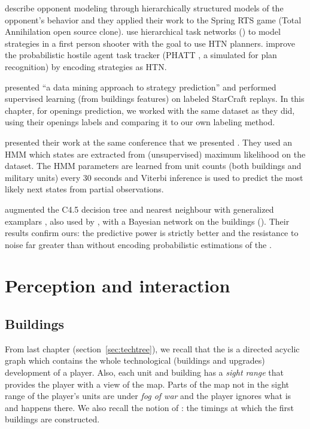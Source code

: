 \cite{schadd2007opponent} describe opponent modeling through hierarchically structured models of the opponent's behavior and they applied their work to the Spring RTS game (Total Annihilation open source clone). \cite{HTNPlanning} use hierarchical task networks () to model strategies in a first person shooter with the goal to use HTN planners. \cite{Kabanza2010} improve the probabilistic hostile agent task tracker (PHATT \citep{PHATT}, a simulated  for plan recognition) by encoding strategies as HTN. 

\cite{weberStrat} presented ``a data mining approach to strategy prediction'' and performed supervised learning (from buildings features) on labeled StarCraft replays. In this chapter, for openings prediction, we worked with the same dataset as they did, using their openings labels and comparing it to our own labeling method. %

\cite{HMMstrat_RTS_AIIDE11} presented their work at the same conference that we presented \citep{SYNNAEVE:StratPred}. They used an HMM which states are extracted from (unsupervised) maximum likelihood on the dataset. The HMM parameters are learned from unit counts (both buildings and military units) every 30 seconds and Viterbi inference is used to predict the most likely next states from partial observations. 

\cite{bjorn2012} augmented the C4.5 decision tree \citep{quinlan1993} and nearest neighbour with generalized examplars \citep{martin1995}, also used by \cite{weberStrat}, with a Bayesian network on the buildings (). Their results confirm ours: the predictive power is strictly better and the resistance to noise far greater than without encoding probabilistic estimations of the .


\section{Perception and interaction}

\subsection{Buildings}
\label{sec:buildings}

From last chapter (section~\ref{sec:techtree}), we recall that the \textit{} is a directed acyclic graph which contains the whole technological (buildings and upgrades) development of a player. Also, each unit and building has a \textit{sight range} that provides the player with a view of the map. Parts of the map not in the sight range of the player's units are under \textit{fog of war} and the player ignores what is and happens there. We also recall the notion of : the timings at which the first buildings are constructed. 


